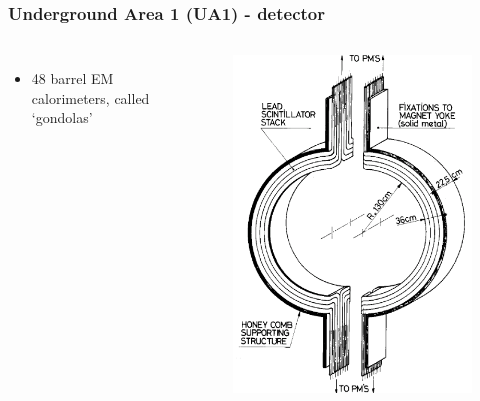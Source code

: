 \documentclass[xcolor=table]{beamer}
\begin{document}
\begin{frame}
\frametitle{Underground Area 1 (UA1) - detector}
\fontsize{9pt}{12}\selectfont

\begin{columns}

\begin{itemize}
\item 48 barrel EM calorimeters, called `gondolas'
\end{itemize}

\begin{figure}[h]
\centering
\includegraphics[height=0.65\textheight]{images/gondola.png}
\end{figure}


\end{columns}
\end{frame}
\end{document}
